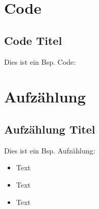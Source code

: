 

\section{Code}                           %
\subsection{Code Titel}                  %
Dies ist ein \acs{Bsp.} Code: \par\vspace\baselineskip  %
\begin{codeblock}                        %
\end{codeblock}
\cleardoublepage



\section{Aufzählung}                     %
\subsection{Aufzählung Titel}            %
Dies ist ein \acs{Bsp.} Aufzählung: \par\vspace\baselineskip %
\begin{itemize}                          %
    \item Text                           %
    \item Text                           %
    \item Text                           %
\end{itemize}
\cleardoublepage


